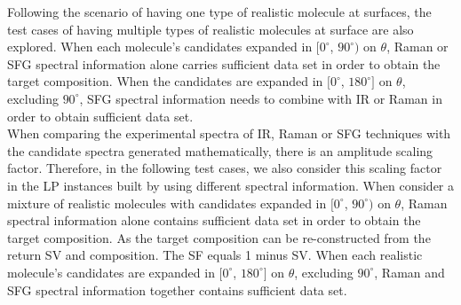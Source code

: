 Following the scenario of having one type of realistic molecule at surfaces, the test cases of having multiple types of realistic molecules at surface are also explored. When each molecule's candidates expanded in $[0^{\circ}$, $90^{\circ})$ on $\theta$, Raman or SFG spectral information alone carries sufficient data set in order to obtain the target composition. When the candidates are expanded in $[0^{\circ}$, $180^{\circ}]$ on $\theta$, excluding $90^{\circ}$, SFG spectral information needs to combine with IR or Raman in order to obtain sufficient data set. \\

When comparing the experimental spectra of IR, Raman or SFG techniques with the candidate spectra generated mathematically, there is an amplitude scaling factor. Therefore, in the following test cases, we also consider this scaling factor in the LP instances built by using different spectral information. When consider a mixture of realistic molecules with candidates expanded in $[0^{\circ}$, $90^{\circ})$ on $\theta$, Raman spectral information alone contains sufficient data set in order to obtain the target composition. As the target composition can be re-constructed from the return SV and composition. The SF equals 1 minus SV. When each realistic molecule's candidates are expanded in $[0^{\circ}$, $180^{\circ}]$ on $\theta$, excluding $90^{\circ}$, Raman and SFG spectral information together contains sufficient data set. \\

